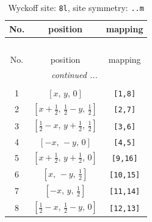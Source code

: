 \documentclass[fleqn,8pt]{jsarticle}
\begin{document}
\begin{longtable}{ccc}
\caption{Wyckoff site: {\tt 8l}, site symmetry: {\tt ..m}}
 \\
 \hline \hline
No. & position & mapping \\ \hline \endfirsthead

\multicolumn{2}{l}{\tablename\ \thetable{}} \\
 \hline \hline
No. & position & mapping \\ \hline \endhead

 \hline \hline
\multicolumn{2}{r}{\footnotesize\it continued ...} \\ \endfoot

 \hline \hline
\multicolumn{2}{r}{} \\ \endlastfoot

1 & $\left[ x,\, y,\, 0 \right]$ & {\tt [1,8]} \\ \hline
2 & $\left[ x + \frac{1}{2},\, \frac{1}{2} - y,\, \frac{1}{2} \right]$ & {\tt [2,7]} \\ \hline
3 & $\left[ \frac{1}{2} - x,\, y + \frac{1}{2},\, \frac{1}{2} \right]$ & {\tt [3,6]} \\ \hline
4 & $\left[ - x,\, - y,\, 0 \right]$ & {\tt [4,5]} \\ \hline
5 & $\left[ x + \frac{1}{2},\, y + \frac{1}{2},\, 0 \right]$ & {\tt [9,16]} \\ \hline
6 & $\left[ x,\, - y,\, \frac{1}{2} \right]$ & {\tt [10,15]} \\ \hline
7 & $\left[ - x,\, y,\, \frac{1}{2} \right]$ & {\tt [11,14]} \\ \hline
8 & $\left[ \frac{1}{2} - x,\, \frac{1}{2} - y,\, 0 \right]$ & {\tt [12,13]} \\
\end{longtable}
\renewcommand{\arraystretch}{1.2}
\end{document}
